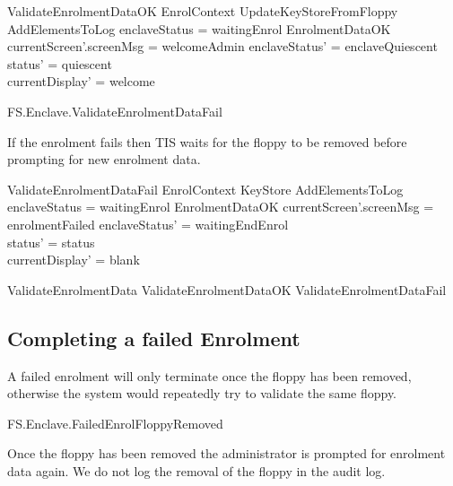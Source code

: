 \begin{schema}{ValidateEnrolmentDataOK}
        EnrolContext
\also
        UpdateKeyStoreFromFloppy
\\      AddElementsToLog
\where
        enclaveStatus = waitingEnrol
\also
        EnrolmentDataOK
\also
        currentScreen'.screenMsg = welcomeAdmin
\also
        enclaveStatus' = enclaveQuiescent 
\\      status' = quiescent
\\      currentDisplay' = welcome
\end{schema}

\begin{traceunit}{FS.Enclave.ValidateEnrolmentDataFail}
\end{traceunit}

If the enrolment fails then TIS waits for the floppy to be removed
before prompting for new enrolment data. 

\begin{schema}{ValidateEnrolmentDataFail}
        EnrolContext
\also
        \Xi KeyStore
\also
        AddElementsToLog
\where
        enclaveStatus = waitingEnrol
\also
        \lnot EnrolmentDataOK
\also
        currentScreen'.screenMsg = enrolmentFailed
\also
        enclaveStatus' = waitingEndEnrol
\\      status' = status
\\      currentDisplay' = blank
\end{schema}

\begin{zed}
        ValidateEnrolmentData  ValidateEnrolmentDataOK \lor
          ValidateEnrolmentDataFail
\end{zed}

\subsection{Completing a failed Enrolment}

A failed enrolment will only terminate once the floppy has been
removed, otherwise the system would repeatedly try to validate the
same floppy.

\begin{traceunit}{FS.Enclave.FailedEnrolFloppyRemoved}
\end{traceunit}


Once the floppy has been removed the administrator is prompted for
enrolment data again. We do not log the removal of the floppy in the
audit log.


